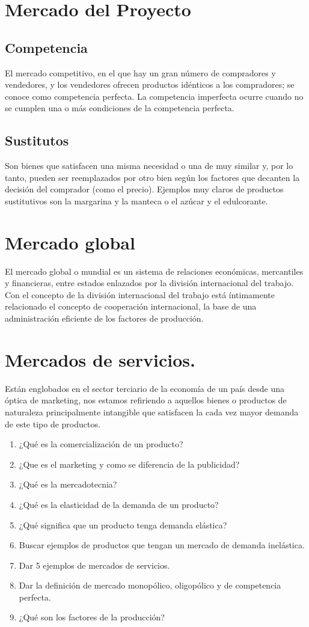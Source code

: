 \documentclass[../main]{subfiles}
\begin{document}
\section{Mercado del Proyecto}
\subsection{Competencia}
El mercado competitivo, en el que hay un gran número de compradores y
vendedores, y los vendedores ofrecen productos idénticos a los
compradores; se conoce como competencia perfecta. La competencia
imperfecta ocurre cuando no se cumplen una o más condiciones de la
competencia perfecta.
\subsection{Sustitutos}
Son bienes que satisfacen una misma necesidad o una de muy similar y,
por lo tanto, pueden ser reemplazados por otro bien según los
factores que decanten la decisión del comprador (como el precio).
Ejemplos muy claros de productos sustitutivos son la margarina y la
manteca o el azúcar y el edulcorante.
\section{Mercado global}
El mercado global o mundial es un sistema de relaciones económicas,
mercantiles y financieras, entre estados enlazados por la división
internacional del trabajo. Con el concepto de la división
internacional del trabajo está íntimamente relacionado el concepto de
cooperación internacional, la base de una administración eficiente de
los factores de producción.
\section{Mercados de servicios.}
Están englobados en el sector terciario de la economía de un país
desde una óptica de marketing, nos estamos refiriendo a aquellos
bienes o productos de naturaleza principalmente intangible que
satisfacen la cada vez mayor demanda de este tipo de productos.
\begin{enumerate}
  \item ¿Qué es la comercialización de un producto?
  \item ¿Que es el marketing y como se diferencia de la publicidad?
  \item ¿Qué es la mercadotecnia?
  \item ¿Qué es la elasticidad de la demanda de un producto?
  \item ¿Qué significa que un producto tenga demanda elástica?
  \item Buscar ejemplos de productos que tengan un mercado de demanda
    inelástica.
  \item Dar 5 ejemplos de mercados de servicios.
  \item Dar la definición de mercado monopólico, oligopólico y de
    competencia perfecta.
  \item ¿Qué son los factores de la producción?
\end{enumerate}
\end{document}
